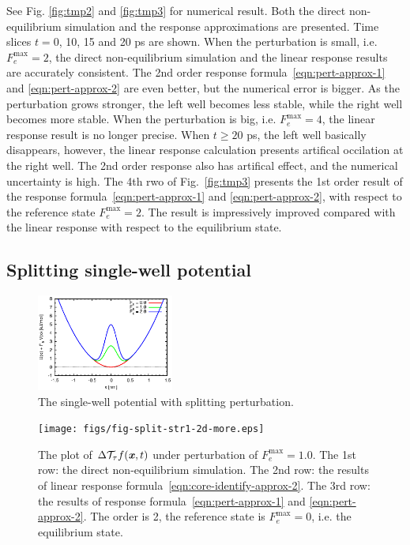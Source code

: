 \documentclass[aip,jcp,a4paper,reprint,onecolumn]{revtex4-1}
\newcommand{\vect}[1]{\textbf{\textit{#1}}}
\newcommand{\mt}{\mathcal T}
\begin{document}
See Fig. \ref{fig:tmp2} and \ref{fig:tmp3} for numerical result.  Both
the direct non-equilibrium simulation and the response
approximations are presented. Time slices $t = 0$, 10, 15 and 20
\textsf{ps} are shown.  When the perturbation is small,
i.e. $F_e^{\textrm{max}} = 2$, the direct non-equilibrium simulation
and the linear response results are accurately consistent.
The 2nd order response formula~\eqref{eqn:pert-approx-1} and
\eqref{eqn:pert-approx-2} are even better, but the numerical error
is bigger.
As the
perturbation grows stronger, the left well becomes less stable, while
the right well becomes more stable.  When the perturbation is big,
i.e. $F_e^{\textrm{max}} = 4$, the linear response result is no
longer precise.
When $t\geq 20$ \textsf{ps}, the left well basically
disappears, however, the linear response calculation presents
artifical occilation at the right well.
The 2nd order response also has artifical effect, and the numerical
uncertainty is high.
The 4th rwo of Fig.~\ref{fig:tmp3} presents the 1st order result of the
response formula~\eqref{eqn:pert-approx-1} and
\eqref{eqn:pert-approx-2}, with
respect to the reference state $F_e^{\textrm{max}} = 2$. The result
is impressively improved compared with the linear response with respect to the
equilibrium state.


\subsection{Splitting single-well potential}

\begin{figure}
  \centering
  \includegraphics[width=0.4\textwidth]{figs/fig-split-pot.eps}
  \caption{The single-well potential with splitting perturbation.}
  \label{fig:tmp4}
\end{figure}

\begin{figure}
  \centering
  \texttt{[image: figs/fig-split-str1-2d-more.eps]}
  \caption{The plot of $\Delta\mt_\tau f(\vect x,t)$  under perturbation of
    $F_e^{\textrm{max}} = 1.0$.
    The 1st row: the direct non-equilibrium
    simulation. The 2nd row: the results of linear response
    formula~\eqref{eqn:core-identify-approx-2}.
    The 3rd row: the results of response
    formula~\eqref{eqn:pert-approx-1} and \eqref{eqn:pert-approx-2}.
    The order is 2, the reference state is $F_e^{\textrm{max}} = 0$, i.e.
    the equilibrium state.
  }
  \label{fig:tmp5}
\end{figure}
\end{document}
